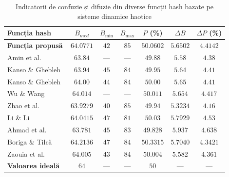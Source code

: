 \begin{table}[!htbp]
    \centering
    \small
    \setlength{\tabcolsep}{4pt}
    \begin{tabular}{|l|c|c|c|c|c|c|}
        \hline
        \textbf{Funcția hash} & $B_{med}$ & $B_{\min}$ & $B_{\max}$ & $P$ (\%) & $\Delta B$ & $\Delta P$ (\%) \\
        \hline
        \textbf{Funcția propusă} & $64.0771$ & $42$ & $85$ & $50.0602$ & $5.6502$ & $4.4142$ \\
        \hline
        Amin et al.~\cite{amin2009} & $63.84$ & --- & --- & $49.88$ & $5.58$ & $4.38$ \\
        \hline
        Kanso \& Ghebleh~\cite{kanso2013} & $63.94$ & $45$ & $84$ & $49.95$ & $5.64$ & $4.41$ \\
        \hline
        Kanso \& Ghebleh~\cite{kanso2015} & $64.00$ & $44$ & $84$ & $50.00$ & $5.65$ & $4.41$ \\
        \hline
        Wu \& Wang~\cite{wu2015} & $64.014$ & --- & --- & $50.011$ & $5.654$ & $4.417$ \\
        \hline
        Zhao et al.~\cite{xiang2015} & $63.9279$ & $40$ & $85$ & $49.94$ & $5.3234$ & $4.16$ \\
        \hline
        Li \& Li~\cite{li2016} & $64.0415$ & $47$ & $81$ & $50.03$ & $5.7929$ & $4.53$ \\
        \hline
        Ahmad et al.~\cite{ahmad2017} & $63.781$ & $45$ & $83$ & $49.828$ & $5.937$ & $4.638$ \\
        \hline
        Boriga \& Tilcă~\cite{boriga2017} & $64.2136$ & $47$ & $84$ & $50.3315$ & $5.7040$ & $4.3421$ \\
        \hline
        Zaouia et al.~\cite{zaouia2023} & $64.005$ & $43$ & $84$ & $50.004$ & $5.582$ & $4.361$ \\
        \hline
        \textbf{Valoarea ideală} & $64$ & --- & --- & $50$ & --- & --- \\
        \hline
    \end{tabular}
    \caption{Indicatorii de confuzie și difuzie din diverse funcții hash bazate pe sisteme dinamice haotice}
    \label{tab:comparatie-confuzie-difuzie}
\end{table}

